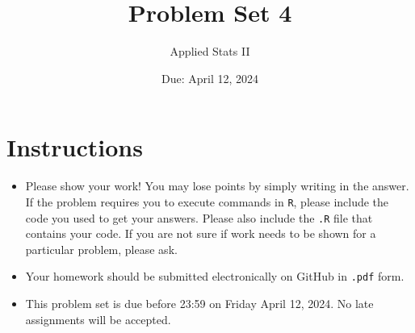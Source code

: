 \documentclass[12pt,letterpaper]{article}
\title{Problem Set 4}
\date{Due: April 12, 2024}
\author{Applied Stats II}
\begin{document}
	\maketitle
	\section*{Instructions}
	\begin{itemize}
	\item Please show your work! You may lose points by simply writing in the answer. If the problem requires you to execute commands in \texttt{R}, please include the code you used to get your answers. Please also include the \texttt{.R} file that contains your code. If you are not sure if work needs to be shown for a particular problem, please ask.
	\item Your homework should be submitted electronically on GitHub in \texttt{.pdf} form.
	\item This problem set is due before 23:59 on Friday April 12, 2024. No late assignments will be accepted.

	\end{itemize}

	\vspace{.25cm}
\end{document}
